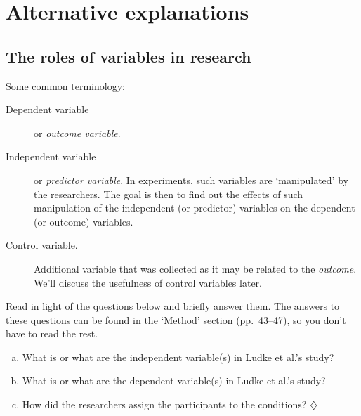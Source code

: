 \documentclass[a4paper]{tufte-book}\usepackage[]{graphicx}\usepackage[]{xcolor}
\newcommand*{\parend}[1][$\diamondsuit$]{%
\leavevmode\unskip\penalty9999 \hbox{}\nobreak\hfill
    \quad\hbox{#1}%
}
\begin{document}
\chapter{Alternative explanations}\label{ch:alternative_explanations}

\section{The roles of variables in research}

Some common terminology:

\begin{description}
  \item[Dependent variable] or \textit{outcome variable}.

  \item[Independent variable] or \textit{predictor variable}.
  In experiments, such variables are `manipulated' by the researchers.
  The goal is then to find out the effects of such manipulation of
  the independent (or predictor) variables on the dependent (or outcome) variables.

  \item[Control variable.] Additional variable that
  was collected as it may be related to the \textit{outcome}.
  We'll discuss the usefulness of control variables later.

\end{description}

\label{ex:ludke}
Read \citet{Ludke2014} in light of the questions below and briefly answer them.
The answers to these questions can be found in the `Method' section 
(pp.~43--47), so you don't have to read the rest.

\begin{enumerate}[(a)]
  \item What is or what are the independent
  variable(s) in Ludke et al.'s study?
  \item What is or what are the dependent
  variable(s) in Ludke et al.'s study? 
  \item How did the researchers assign the participants to the conditions?\parend
\end{enumerate}
\end{document}
